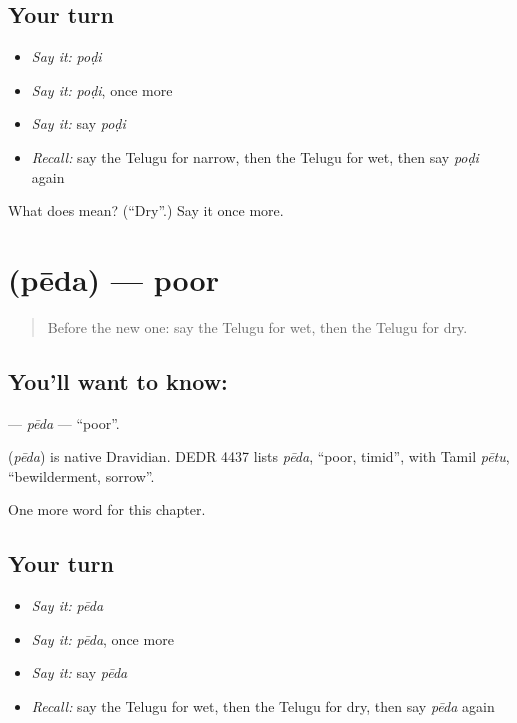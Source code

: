 \subsection*{Your turn}
\begin{itemize}
\raggedright
  \item \emph{Say it:} \emph{poḍi}
  \item \emph{Say it:} \emph{poḍi}, once more
  \item \emph{Say it:} say \emph{poḍi}
  \item \emph{Recall:} say the Telugu for narrow, then the Telugu for wet, then say \emph{poḍi} again
\end{itemize}

\begin{tcolorbox}[breakable,colback=teal!4,colframe=teal!35!black,title={Before you move on}]
What does  mean? (\textquotedblleft{}Dry\textquotedblright{}.) Say it once more.
\end{tcolorbox}
\section[\texorpdfstring{\te{పేద} (pēda)}{పేద (pēda)}]{ (pēda) — poor}

\label{lesson:TE-C139-peda}



\begin{quote}
Before the new one: say the Telugu for wet, then the Telugu for dry.
\end{quote}

\subsection*{You'll want to know: }
\textbf{} — \emph{pēda} — \textquotedblleft{}poor\textquotedblright{}.

\begin{cousinweb}
\textbf{} (\emph{pēda}) is native Dravidian. DEDR 4437 lists \emph{pēda}, \textquotedblleft{}poor, timid\textquotedblright{}, with Tamil \emph{pētu}, \textquotedblleft{}bewilderment, sorrow\textquotedblright{}.
\end{cousinweb}

\begin{grammarlens}[title={What you've built}]
One more word for this chapter.
\end{grammarlens}

\subsection*{Your turn}
\begin{itemize}
\raggedright
  \item \emph{Say it:} \emph{pēda}
  \item \emph{Say it:} \emph{pēda}, once more
  \item \emph{Say it:} say \emph{pēda}
  \item \emph{Recall:} say the Telugu for wet, then the Telugu for dry, then say \emph{pēda} again
\end{itemize}

